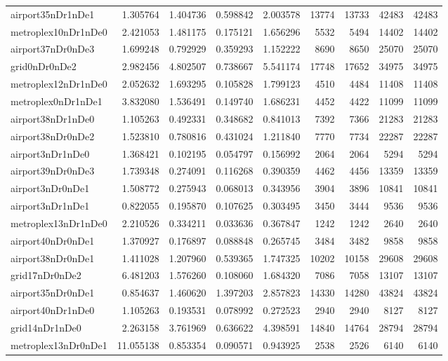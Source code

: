 \begin{longtable}{|l|r|r|r|r|r|r|r|r|}
airport35nDr1nDe1 & 1.305764 & 1.404736 & 0.598842 & 2.003578 & 13774 & 13733 & 42483 & 42483 \\
metroplex10nDr1nDe0 & 2.421053 & 1.481175 & 0.175121 & 1.656296 & 5532 & 5494 & 14402 & 14402 \\
airport37nDr0nDe3 & 1.699248 & 0.792929 & 0.359293 & 1.152222 & 8690 & 8650 & 25070 & 25070 \\
grid0nDr0nDe2 & 2.982456 & 4.802507 & 0.738667 & 5.541174 & 17748 & 17652 & 34975 & 34975 \\
metroplex12nDr1nDe0 & 2.052632 & 1.693295 & 0.105828 & 1.799123 & 4510 & 4484 & 11408 & 11408 \\
metroplex0nDr1nDe1 & 3.832080 & 1.536491 & 0.149740 & 1.686231 & 4452 & 4422 & 11099 & 11099 \\
airport38nDr1nDe0 & 1.105263 & 0.492331 & 0.348682 & 0.841013 & 7392 & 7366 & 21283 & 21283 \\
airport38nDr0nDe2 & 1.523810 & 0.780816 & 0.431024 & 1.211840 & 7770 & 7734 & 22287 & 22287 \\
airport3nDr1nDe0 & 1.368421 & 0.102195 & 0.054797 & 0.156992 & 2064 & 2064 & 5294 & 5294 \\
airport39nDr0nDe3 & 1.739348 & 0.274091 & 0.116268 & 0.390359 & 4462 & 4456 & 13359 & 13359 \\
airport3nDr0nDe1 & 1.508772 & 0.275943 & 0.068013 & 0.343956 & 3904 & 3896 & 10841 & 10841 \\
airport3nDr1nDe1 & 0.822055 & 0.195870 & 0.107625 & 0.303495 & 3450 & 3444 & 9536 & 9536 \\
metroplex13nDr1nDe0 & 2.210526 & 0.334211 & 0.033636 & 0.367847 & 1242 & 1242 & 2640 & 2640 \\
airport40nDr0nDe1 & 1.370927 & 0.176897 & 0.088848 & 0.265745 & 3484 & 3482 & 9858 & 9858 \\
airport38nDr0nDe1 & 1.411028 & 1.207960 & 0.539365 & 1.747325 & 10202 & 10158 & 29608 & 29608 \\
grid17nDr0nDe2 & 6.481203 & 1.576260 & 0.108060 & 1.684320 & 7086 & 7058 & 13107 & 13107 \\
airport35nDr0nDe1 & 0.854637 & 1.460620 & 1.397203 & 2.857823 & 14330 & 14280 & 43824 & 43824 \\
airport40nDr1nDe0 & 1.105263 & 0.193531 & 0.078992 & 0.272523 & 2940 & 2940 & 8127 & 8127 \\
grid14nDr1nDe0 & 2.263158 & 3.761969 & 0.636622 & 4.398591 & 14840 & 14764 & 28794 & 28794 \\
metroplex13nDr0nDe1 & 11.055138 & 0.853354 & 0.090571 & 0.943925 & 2538 & 2526 & 6140 & 6140 \\

\end{longtable}
